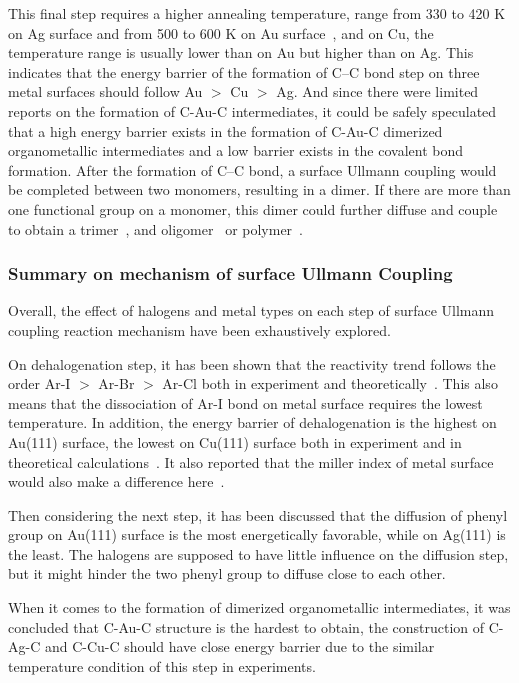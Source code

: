 \documentclass[%
 reprint,
 amsmath,amssymb,
 aps,
prb,
]{revtex4-2}
\begin{document}
This final step requires a higher annealing temperature, range from 330 to 420 K on Ag surface and from 500 to 600 K on Au surface~\cite{ullmann_51}, and on Cu, the temperature range is usually lower than on Au but higher than on Ag. This indicates that the energy barrier of the formation of C--C bond step on three metal surfaces should follow Au $>$ Cu $>$ Ag. And since  there were limited reports on the formation of C-Au-C intermediates, it could be safely speculated that a high energy barrier exists in the formation of C-Au-C dimerized organometallic intermediates and a low barrier exists in the  covalent bond formation. After the formation of C--C bond, a surface Ullmann coupling would be completed between two monomers, resulting in a dimer. If there are more than one functional group on a monomer, this dimer could further diffuse and couple to obtain a trimer~\cite{jacs2016}, and oligomer~\cite{ullmann_53, ullmann_56} or polymer~\cite{ullmann_43, ullmann_54, ullmann_55}.

\subsubsection{Summary on mechanism of surface Ullmann Coupling}

Overall, the effect of halogens and metal types on each step of surface Ullmann coupling reaction mechanism have been exhaustively explored. 

On dehalogenation step, it has been shown that the reactivity trend follows the order Ar-I $>$ Ar-Br $>$ Ar-Cl both in experiment and theoretically~\cite{ullmann_52}. This also means that the dissociation of Ar-I bond on metal surface requires the lowest temperature. In addition, the energy barrier of dehalogenation is the highest on Au(111) surface, the lowest on Cu(111) surface both in experiment and in theoretical calculations~\cite{jacs2013}. It also reported that the miller index of metal surface would also make a difference here~\cite{ullmann_57}. 

Then considering the next step, it has been discussed that the diffusion of phenyl group on Au(111) surface is the most energetically favorable, while on Ag(111) is the least. The halogens are supposed to have little influence on the diffusion step, but it might hinder the two phenyl group to diffuse close to each other. 

When it comes to the formation of dimerized organometallic intermediates, it was concluded that C-Au-C structure is the hardest to obtain, the construction of C-Ag-C and C-Cu-C should have close energy barrier due to the similar temperature condition of this step in experiments. 
\end{document}
